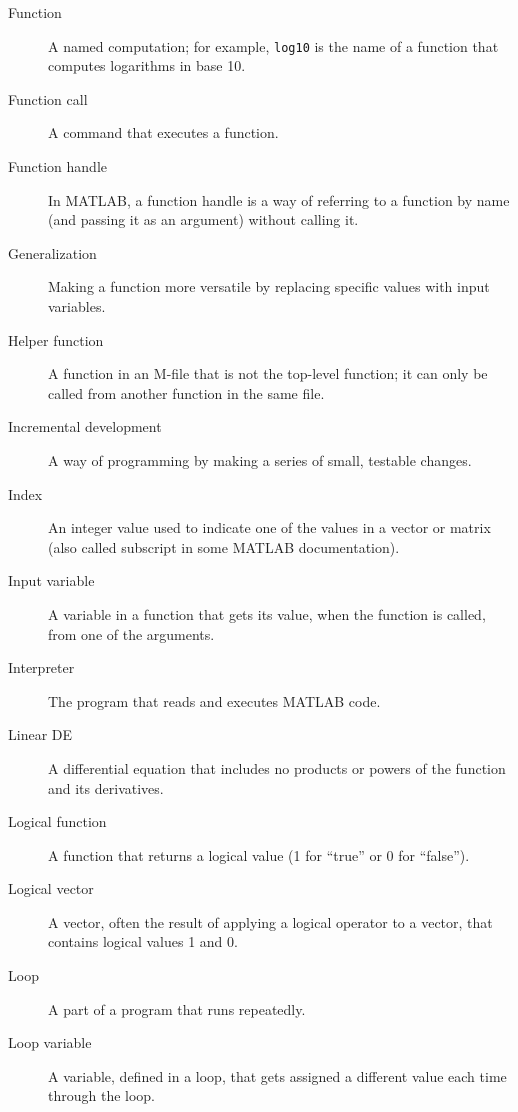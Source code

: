 \begin{description}
\item[Function] A named computation; for example, \lstinline{log10} is the
name of a function that computes logarithms in base 10.

\item[Function call] A command that executes a function.

\item[Function handle] In MATLAB, a function handle is a way of
referring to a function by name (and passing it as an argument)
without calling it.

\item[Generalization] Making a function more versatile by replacing
specific values with input variables.

\item[Helper function] A function in an M-file that is not
the top-level function; it can only be called from another function
in the same file.

\item[Incremental development] A way of programming by making a series
of small, testable changes.

\item[Index] An integer value used to indicate one of the values
in a vector or matrix (also called subscript in some MATLAB documentation).

\item[Input variable] A variable in a function that gets its value,
when the function is called, from one of the arguments.

\item[Interpreter] The program that reads and executes MATLAB code.

\item[Linear DE] A differential equation that includes no products or powers of the
function and its derivatives.

\item[Logical function] A function that returns a logical value
(1 for ``true'' or 0 for ``false'').

\item[Logical vector] A vector, often the result of applying a logical operator to a vector, that contains logical values 1 and 0.

\item[Loop] A part of a program that runs repeatedly.

\item[Loop variable] A variable, defined in a loop,
that gets assigned a different value each time through the loop.


\end{description}
